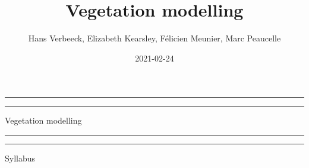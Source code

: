 \documentclass[
  oneside]{book}
\title{Vegetation modelling}
\author{Hans Verbeeck, Elizabeth Kearsley, Félicien Meunier, Marc Peaucelle}
\date{2021-02-24}
\begin{document}
\maketitle

\newcommand{\plogo}{\fbox{$\mathcal{PL}$}} %
\frontmatter


\begin{titlepage} %

	\centering %
	
	\scshape %
	
	\vspace*{\baselineskip} %
	
	
	\vspace{12\baselineskip}
	
	\rule{\textwidth}{1.6pt}\vspace*{-\baselineskip}\vspace*{2pt} %
	\rule{\textwidth}{0.4pt} %
	
	\vspace{0.75\baselineskip} %
	
	{\LARGE Vegetation modelling\\} %
	
	\vspace{0.75\baselineskip} %
	
	\rule{\textwidth}{0.4pt}\vspace*{-\baselineskip}\vspace{3.2pt} %
	\rule{\textwidth}{1.6pt} %
	
	\vspace{2\baselineskip} %
	
	
	Syllabus %
	
	\vspace*{3\baselineskip} %
	
	

\end{titlepage}
\end{document}
